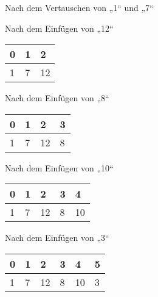 \documentclass{bschlangaul-aufgabe}
\begin{document}
\begin{enumerate}
\begin{enumerate}
\begin{bAntwort}
\begin{bBaum}{Nach dem Vertauschen von „1“ und „7“}
\end{bBaum}

\begin{bBaum}{Nach dem Einfügen von „12“}
\begin{tabular}{lll}
\bf{0} & \bf{1} & \bf{2} \\
\hline
1      & 7      & 12     \\
\end{tabular}

\end{bBaum}

\begin{bBaum}{Nach dem Einfügen von „8“}
\begin{tabular}{llll}
\bf{0} & \bf{1} & \bf{2} & \bf{3} \\
\hline
1      & 7      & 12     & 8      \\
\end{tabular}

\end{bBaum}

\begin{bBaum}{Nach dem Einfügen von „10“}
\begin{tabular}{lllll}
\bf{0} & \bf{1} & \bf{2} & \bf{3} & \bf{4} \\
\hline
1      & 7      & 12     & 8      & 10     \\
\end{tabular}

\end{bBaum}

\begin{bBaum}{Nach dem Einfügen von „3“}
\begin{tabular}{llllll}
\bf{0} & \bf{1} & \bf{2} & \bf{3} & \bf{4} & \bf{5} \\
\hline
1      & 7      & 12     & 8      & 10     & 3      \\
\end{tabular}


\end{bBaum}
\end{bAntwort}
\end{enumerate}
\end{enumerate}
\end{document}
